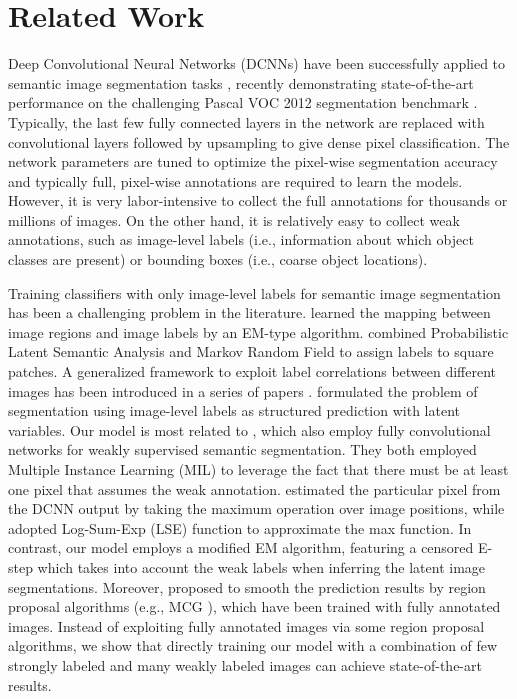 \section{Related Work}
Deep Convolutional Neural Networks (DCNNs) have been successfully applied to semantic image segmentation tasks \citep{farabet2013learning, pinheiro2014recurrent, eigen2014predicting}, recently demonstrating state-of-the-art performance on the challenging Pascal VOC 2012 segmentation benchmark \citep{chen2014semantic, mostajabi2014feedforward, long2014fully}. Typically, the last few fully connected layers in the network are replaced with convolutional layers followed by upsampling \citep{long2014fully, papandreou2014untangling} to give dense pixel classification. The network parameters are tuned to optimize the pixel-wise segmentation accuracy and typically full, pixel-wise annotations are required to learn the models. However, it is very labor-intensive to collect the full annotations for thousands or millions of images. On the other hand, it is relatively easy to collect weak annotations, such as image-level labels (i.e., information about which object classes are present) or bounding boxes (i.e., coarse object locations).

Training classifiers with only image-level labels for semantic image segmentation has been a challenging problem in the literature. \citet{duygulu2002object} learned the mapping between image regions and image labels by an EM-type algorithm. \citet{verbeek2007region} combined Probabilistic Latent Semantic Analysis and Markov Random Field to assign labels to square patches. A generalized framework to exploit label correlations between different images has been introduced in a series of papers \citep{vezhnevets2010towards, vezhnevets2011weakly, vezhnevets2012weakly}. \citet{xu2014tell} formulated the problem of segmentation using image-level labels as structured prediction with latent variables. Our model is most related to \citet{pathak2014fully, pinheiro2014weakly}, which also employ fully convolutional networks for weakly supervised semantic segmentation. They both employed Multiple Instance Learning (MIL) to leverage the fact that there must be at least one pixel that assumes the weak annotation. \citet{pathak2014fully} estimated the particular pixel from the DCNN output by taking the maximum operation over image positions, while \citet{pinheiro2014weakly} adopted Log-Sum-Exp (LSE) function to approximate the max function. In contrast, our model employs a modified EM algorithm, featuring a censored E-step which takes into account the weak labels when inferring the latent image segmentations. Moreover, \citet{pinheiro2014weakly} proposed to smooth the prediction results by region proposal algorithms (e.g., MCG \citep{arbelaez2014multiscale}), which have been trained with fully annotated images. Instead of exploiting fully annotated images via some region proposal algorithms, we show that directly training our model with a combination of few strongly labeled and many weakly labeled images can achieve state-of-the-art results.

